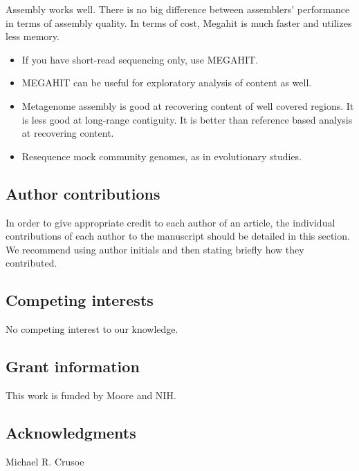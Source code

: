 \documentclass[10pt,a4paper,twocolumn]{article}
\begin{document}
Assembly works well. There is no big difference between assemblers'
performance in terms of assembly quality. In terms of cost, Megahit is
much faster and utilizes less memory.

\begin{itemize}
\item If you have short-read sequencing only, use MEGAHIT.
\item MEGAHIT can be useful for exploratory analysis of content as well.
\item Metagenome assembly is good at recovering content of well covered
  regions.  It is less good at long-range contiguity. It is better than
  reference based analysis at recovering content.
\item Resequence mock community genomes, as in evolutionary studies.
\end{itemize}



\subsection*{Author contributions}
In order to give appropriate credit to each author of an article, the
individual contributions of each author to the manuscript should be
detailed in this section. We recommend using author initials and then
stating briefly how they contributed.

\subsection*{Competing interests}
No competing interest to our knowledge.

\subsection*{Grant information}
This work is funded by Moore and NIH.

\subsection*{Acknowledgments}
Michael R. Crusoe

{\small }
\end{document}

